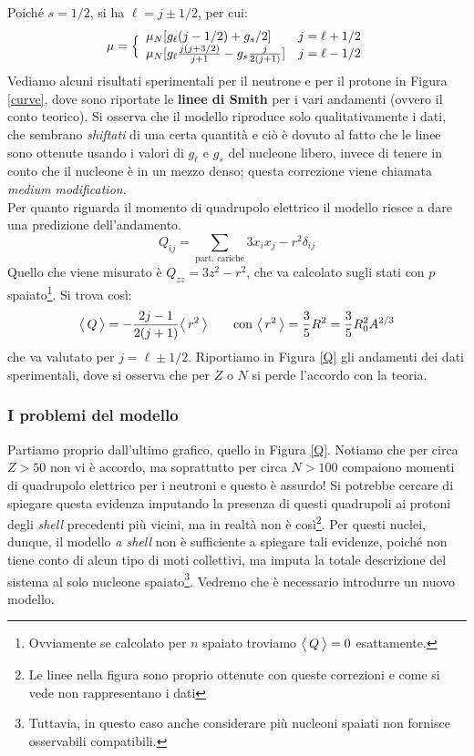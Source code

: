 Poiché $s=1/2$, si ha $\ell=j\pm 1/2$, per cui:
$$\mu = \Bigl \{
\begin{array}{ll}
    \mu_N [g_\ell (j-1/2)+g_s/2] & j = \ell+1/2 \\
    \mu_N [g_\ell \frac{j(j+3/2)}{j+1}- g_s \frac{j}{2(j+1)}] & j = \ell -1/2 
\end{array}$$
Vediamo alcuni risultati sperimentali per il neutrone e per il protone in Figura \ref{curve}, dove sono riportate le \textbf{linee di Smith} per i vari andamenti (ovvero il conto teorico). Si osserva che il modello riproduce solo qualitativamente i dati, che sembrano \textit{shiftati} di una certa quantità e ciò è dovuto al fatto che le linee sono ottenute usando i valori di $g_\ell$ e $g_s$ del nucleone libero, invece di tenere in conto che il nucleone è  in un mezzo denso; questa correzione viene chiamata \textit{medium modification}.\\
Per quanto riguarda il momento di quadrupolo elettrico il modello riesce a dare una predizione dell'andamento.
$$Q_{ij} = \sum_\text{part. cariche} 3x_ix_j -r^2\delta_{ij}$$
Quello che viene misurato è $Q_{zz} = 3z^2 - r^2$, che va calcolato sugli stati con $p$ spaiato\footnote{Ovviamente se calcolato per $n$ spaiato troviamo $\bigl\langle\, Q\, \bigr\rangle = 0$ esattamente.}. Si trova così:
$$\bigl\langle\, Q\, \bigr\rangle = -\frac{2j-1}{2(j+1)}\bigl\langle\, r^2\, \bigr\rangle\qquad \text{con } \bigl\langle\, r^2\, \bigr\rangle = \frac{3}{5}R^2 =\frac{3}{5}R_0^2A^{2/3}$$
che va valutato per $j=\ell\pm 1/2$. Riportiamo in Figura \ref{Q} gli andamenti dei dati sperimentali, dove si osserva che per $Z$ o $N$  si perde l'accordo con la teoria.

\subsubsection{I problemi del modello} 
Partiamo proprio dall'ultimo grafico, quello in Figura \ref{Q}. Notiamo che per circa $Z>50$ non vi è accordo, ma soprattutto per circa $N>100$ compaiono momenti di quadrupolo elettrico per i neutroni e questo è assurdo! Si potrebbe cercare di spiegare questa evidenza imputando la presenza di questi quadrupoli ai protoni degli \textit{shell} precedenti più vicini, ma in realtà non è così\footnote{Le linee nella figura sono proprio ottenute con queste correzioni e come si vede non rappresentano i dati}. Per questi nuclei, dunque, il modello \textit{a shell} non è sufficiente a spiegare tali evidenze, poiché non tiene conto di alcun tipo di moti collettivi, ma imputa la totale descrizione del sistema al solo nucleone spaiato\footnote{Tuttavia, in questo caso anche considerare più nucleoni spaiati non fornisce osservabili compatibili.}. Vedremo che è necessario introdurre un nuovo modello.

